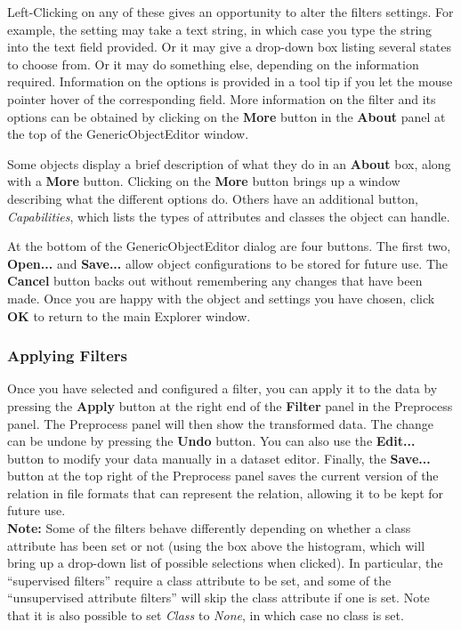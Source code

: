 Left-Clicking on any of these gives an
opportunity to alter the filters settings. For example, the setting
may take a text string, in which case you type the string into the
text field provided.  Or it may give a drop-down box listing several
states to choose from. Or it may do something else, depending on the
information required. Information on the options is provided in a tool
tip if you let the mouse pointer hover of the corresponding
field. More information on the filter and its options can be obtained
by clicking on the \textbf{More} button in the \textbf{About} panel at
the top of the GenericObjectEditor window.

Some objects display a brief description of what they do in an \textbf{About}
box, along with a \textbf{More} button. Clicking on the \textbf{More} button
brings up a window describing what the different options do. Others have an 
additional button, \textit{Capabilities}, which lists the types of
attributes and classes the object can handle. 

At the bottom of the GenericObjectEditor dialog are four buttons. The first
two, \textbf{Open...} and \textbf{Save...} allow object configurations to be
stored for future use. The \textbf{Cancel} button backs out without remembering
any changes that have been made.  Once you are happy with the object and
settings you have chosen, click \textbf{OK} to return to the main Explorer
window.

\subsubsection*{Applying Filters}

Once you have selected and configured a filter, you can apply it to
the data by pressing the \textbf{Apply} button at the right end of the
\textbf{Filter} panel in the Preprocess panel. The Preprocess panel
will then show the transformed data. The change can be undone by
pressing the \textbf{Undo} button. You can also use the
\textbf{Edit...} button to modify your data manually in a dataset
editor.  Finally, the \textbf{Save...}  button at the top right of the
Preprocess panel saves the current version of the relation in file
formats that can represent the relation, allowing it to be kept for future
use.  \\

\noindent \textbf{Note:} Some of the filters behave differently
depending on whether a class attribute has been set or not (using the
box above the histogram, which will bring up a drop-down list of
possible selections when clicked). In particular, the ``supervised
filters'' require a class attribute to be set, and some of the
``unsupervised attribute filters'' will skip the class attribute if
one is set. Note that it is also possible to set {\em Class} to {\em
None}, in which case no class is set.

